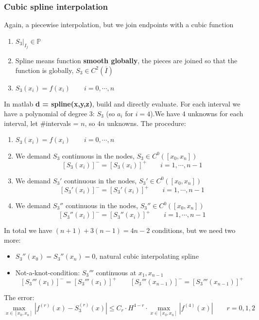    \subsubsection{Cubic spline interpolation}
    Again, a piecewise interpolation, but we join endpoints with a cubic function
    \begin{enumerate}
        \item $S_3\Big|_{I_j}\in\mathbb{P}$
        \item Spline means function \textbf{smooth globally}, the pieces are joined so that the function is globally, $S_3\in C^2(\overline{I})$
        \item $S_3(x_i)=f(x_i)\qquad i=0,\cdots,n$
    \end{enumerate}
    In matlab \textbf{d = spline(x,y,z)}, build and directly evaluate. For each interval we have a polynomial of degree 3: $S_3$ (so $a_i$ for $i=4$).We have 4 unknowns for each interval, let \#intervals = $n$, so $4n$ unknowns. The procedure:
    \begin{enumerate}[1)]
        \item $S_3(x_i)=f(x_i)\qquad i=0,\cdots,n$
        \item We demand $S_3$ continuous in the nodes, $S_3\in C^0\left(\left[
            x_0,x_n
        \right]\right)$
        $$
        \left[S_3(x_i)\right]^-=
        \left[S_3(x_i)\right]^+
        \qquad i=1,\cdots,n-1
        $$
        \item We demand $S_3'$ continuous in the nodes, $S_3'\in C^0\left(\left[
            x_0,x_n
        \right]\right)$
        $$
        \left[S_3'(x_i)\right]^-=
        \left[S_3'(x_i)\right]^+
        \qquad i=1,\cdots,n-1
        $$
        \item We demand $S_3''$ continuous in the nodes, $S_3''\in C^0\left(\left[
            x_0,x_n
        \right]\right)$
        $$
        \left[S_3''(x_i)\right]^-=
        \left[S_3''(x_i)\right]^+
        \qquad i=1,\cdots,n-1
        $$
    \end{enumerate}
    In total we have $(n+1)+3(n-1)=4n-2$ conditions, but we need two more:
    \begin{itemize}
        \item $S_3''(x_0)=S_3''(x_n)=0$, natural cubic interpolating spline
        \item Not-a-knot-condition: $S_3'''$ continuous at $x_1,x_{n-1}$
        $$
        \left[
            S_3'''(x_1)
        \right]^-=
        \left[
            S_3'''(x_1)
        \right]^+
        \qquad
        \left[
            S_3'''(x_{n-1})
        \right]^-=
        \left[
            S_3'''(x_{n-1})
        \right]^+
        $$
    \end{itemize}
    The error:
    $$
    \max_{x\in\left[x_0,x_n\right]}
    \left|
        f^{(r)}(x)-
        S_3^{(r)}(x)
    \right|\leq
    C_r\cdot
    H^{4-r}\cdot
    \max_{x\in\left[x_0,x_n\right]}
    \left|
        f^{(4)}(x)
    \right|
    \qquad r=0,1,2
    $$


